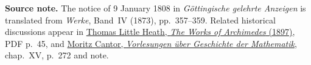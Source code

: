 \par\medskip\begin{small}\noindent\textbf{Source note.} The notice of 9 January 1808 in \textit{Göttingische gelehrte Anzeigen} is translated from \textit{Werke}, Band~IV (1873), pp.~357--359. Related historical discussions appear in \href{https://tonywilliams1990.github.io/great_works/Archimedes/The_Works_of_Archimedes.pdf}{Thomas Little Heath, \textit{The Works of Archimedes} (1897)}, PDF p.~45, and \href{https://www.e-rara.ch/download/pdf/5691450.pdf}{Moritz Cantor, \textit{Vorlesungen über Geschichte der Mathematik}}, chap.~XV, p.~272 and note.\par\end{small}
